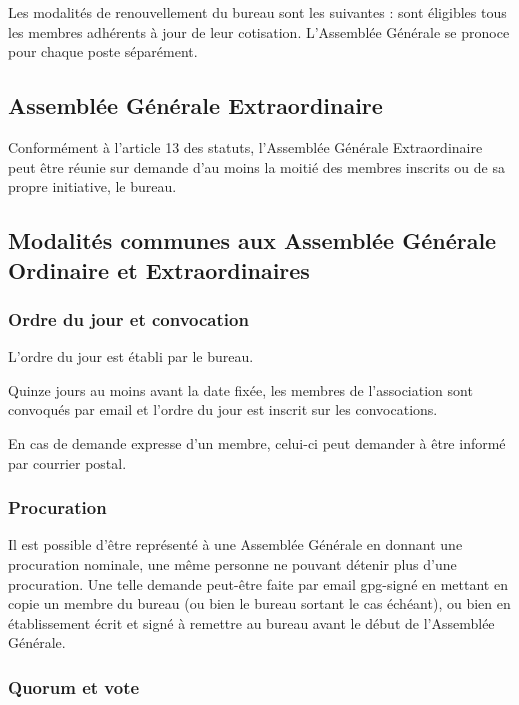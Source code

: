 \documentclass[a4paper,french,10pt]{article}
\begin{document}
Les modalités de renouvellement du bureau sont les suivantes : sont éligibles tous les membres adhérents à jour de leur cotisation. L'Assemblée Générale se pronoce pour chaque poste séparément.

\subsection{Assemblée Générale Extraordinaire}
\label{sec:age}
Conformément à l'article 13 des statuts, l'Assemblée Générale Extraordinaire peut être réunie sur demande d'au moins la moitié des membres inscrits ou de sa propre initiative, le bureau.

\subsection{Modalités communes aux Assemblée Générale Ordinaire et Extraordinaires}
\label{sec:ag}

\subsubsection*{Ordre du jour et convocation}
\label{sec:ordre-du-jour-1}

L'ordre du jour est établi par le bureau.

Quinze jours au moins avant la date fixée, les membres de
l’association sont convoqués par email et l’ordre du jour est inscrit
sur les convocations.

En cas de demande expresse d'un membre, celui-ci peut demander à être
informé par courrier postal.

\subsubsection*{Procuration}
\label{sec:procuration}

Il est possible d’être représenté à une Assemblée Générale en donnant
une procuration nominale, une même personne ne pouvant détenir plus
d’une procuration. Une telle demande peut-être faite par email
gpg-signé en mettant en copie un membre du bureau (ou bien le bureau
sortant le cas échéant), ou bien en établissement écrit et signé à
remettre au bureau avant le début de l'Assemblée Générale.

\subsubsection{Quorum et vote}
\label{sec:quorum}
\end{document}
